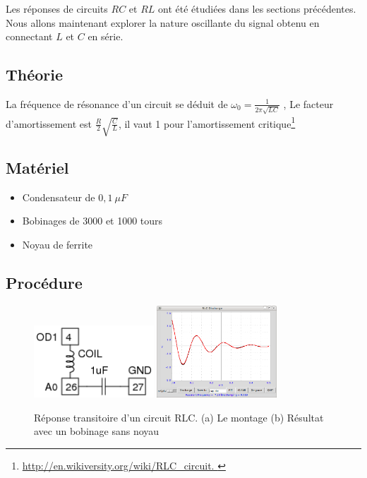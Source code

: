 \documentclass{book}
\begin{document}
Les réponses de circuits $RC$ et $RL$ ont été étudiées dans les sections précédentes. Nous allons maintenant explorer la nature oscillante du signal obtenu en connectant $L$ et $C$ en série.

\subsection{Théorie}


La fréquence de résonance d'un circuit se déduit de $\omega_{0}=\frac{1}{2\pi\sqrt{LC} }$ , Le facteur d'amortissement est $\frac{R}{2}\sqrt{\frac{C}{L} }$,
il vaut 1 pour l'amortissement critique\footnote{\href{http://en.wikiversity.org/wiki/RLC\_circuit}{\mbox{http://en.wikiversity.org/wiki/RLC\_circuit}.
} 
 }
\subsection{Matériel}


\begin{itemize}
  \item Condensateur de $0,1\ \mu F$
  \item Bobinages de 3000 et 1000 tours
  \item Noyau de ferrite
\end{itemize}

\subsection{Procédure}


\begin{figure}[h!]
\begin{center}
\caption{\label{fig:LCR-response-setup}Réponse transitoire d'un circuit RLC. (a) Le montage (b) Résultat avec un bobinage sans noyau }\vspace{0.5em}
\includegraphics[width=0.4\textwidth, height=0.3\textwidth, keepaspectratio]{Schematic-lc-tran.png}
\includegraphics[width=0.4\textwidth, height=0.3\textwidth, keepaspectratio]{Pic-LCRdischarge.png}
\end{center}
\end{figure}
\end{document}
